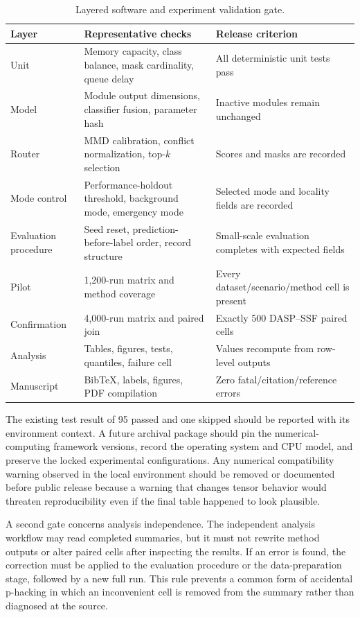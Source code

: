 \begin{table}[t]
\caption{Layered software and experiment validation gate.}
\label{tab:test-coverage}
\centering
\scriptsize
\begin{tabular}{p{}p{}p{}}
\toprule
Layer & Representative checks & Release criterion\\
\midrule
Unit & Memory capacity, class balance, mask cardinality, queue delay & All deterministic unit tests pass\\
Model & Module output dimensions, classifier fusion, parameter hash & Inactive modules remain unchanged\\
Router & MMD calibration, conflict normalization, top-$k$ selection & Scores and masks are recorded\\
Mode control & Performance-holdout threshold, background mode, emergency mode & Selected mode and locality fields are recorded\\
Evaluation procedure & Seed reset, prediction-before-label order, record structure & Small-scale evaluation completes with expected fields\\
Pilot & 1,200-run matrix and method coverage & Every dataset/scenario/method cell is present\\
Confirmation & 4,000-run matrix and paired join & Exactly 500 DASP--SSF paired cells\\
Analysis & Tables, figures, tests, quantiles, failure cell & Values recompute from row-level outputs\\
Manuscript & BibTeX, labels, figures, PDF compilation & Zero fatal/citation/reference errors\\
\bottomrule
\end{tabular}
\end{table}

The existing test result of 95 passed and one skipped should be reported with its environment context. A future archival package should pin the numerical-computing framework versions, record the operating system and CPU model, and preserve the locked experimental configurations. Any numerical compatibility warning observed in the local environment should be removed or documented before public release because a warning that changes tensor behavior would threaten reproducibility even if the final table happened to look plausible.

A second gate concerns analysis independence. The independent analysis workflow may read completed summaries, but it must not rewrite method outputs or alter paired cells after inspecting the results. If an error is found, the correction must be applied to the evaluation procedure or the data-preparation stage, followed by a new full run. This rule prevents a common form of accidental p-hacking in which an inconvenient cell is removed from the summary rather than diagnosed at the source.

